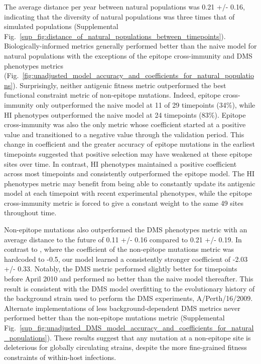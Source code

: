 The average distance per year between natural populations was 0.21 +/- 0.16, indicating that the diversity of natural populations was three times that of simulated populations (Supplemental Fig.~\ref{sup_fig:distance_of_natural_populations_between_timepoints}).
Biologically-informed metrics generally performed better than the naive model for natural populations with the exceptions of the epitope cross-immunity and DMS phenotypes metrics (Fig.~\ref{fig:unadjusted_model_accuracy_and_coefficients_for_natural_populations}).
Surprisingly, neither antigenic fitness metric outperformed the best functional constraint metric of non-epitope mutations.
Indeed, epitope cross-immunity only outperformed the naive model at 11 of 29 timepoints (34\%), while HI phenotypes outperformed the naive model at 24 timepoints (83\%).
Epitope cross-immunity was also the only metric whose coefficient started at a positive value and transitioned to a negative value through the validation period.
This change in coefficient and the greater accuracy of epitope mutations in the earliest timepoints suggested that positive selection may have weakened at these epitope sites over time.
In contrast, HI phenotypes maintained a positive coefficient across most timepoints and consistently outperformed the epitope model.
The HI phenotypes metric may benefit from being able to constantly update its antigenic model at each timepoint with recent experimental phenotypes, while the epitope cross-immunity metric is forced to give a constant weight to the same 49 sites throughout time.

Non-epitope mutations also outperformed the DMS phenotypes metric with an average distance to the future of 0.11 +/- 0.16 compared to 0.21 +/- 0.19.
In contrast to \cite{Luksza:2014hj}, where the coefficient of the non-epitope mutations metric was hardcoded to -0.5, our model learned a consistently stronger coefficient of -2.03 +/- 0.33.
Notably, the DMS metric performed slightly better for timepoints before April 2010 and performed no better than the naive model thereafter.
This result is consistent with the DMS model overfitting to the evolutionary history of the background strain used to perform the DMS experiments, A/Perth/16/2009.
Alternate implementations of less background-dependent DMS metrics never performed better than the non-epitope mutations metric (Supplemental Fig.~\ref{sup_fig:unadjusted_DMS_model_accuracy_and_coefficients_for_natural_populations}).
These results suggest that any mutation at a non-epitope site is deleterious for globally circulating strains, despite the more fine-grained fitness constraints of within-host infections.

